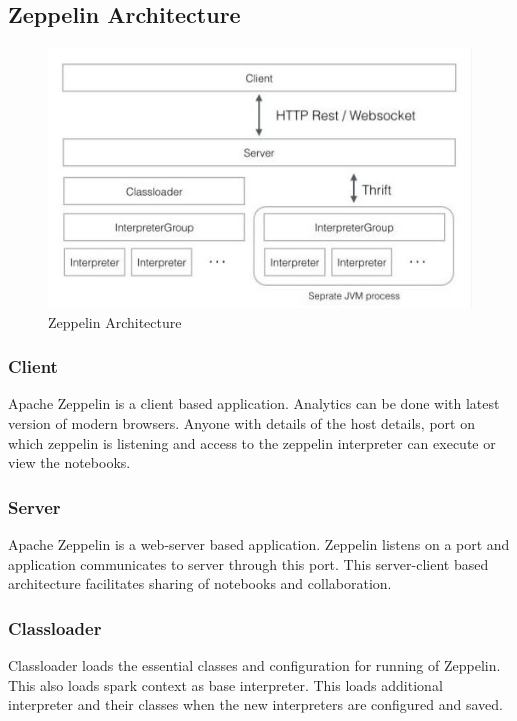 \documentclass[9pt,twocolumn,twoside]{../../styles/osajnl}
\begin{document}
	\subsection{Zeppelin Architecture}
	
	\begin{figure}
		\includegraphics[width=\linewidth]{./images/zeppelin-arch}
		\caption{Zeppelin Architecture}
		\label{fig:Zeppelin Architecture}
	\end{figure}
	
	\subsubsection{Client}
	Apache Zeppelin is a client based application. Analytics can be 
	done with latest version of modern browsers. Anyone with details 
	of the host details, port on which zeppelin is listening and 
	access to the zeppelin interpreter can execute or view the 
	notebooks.
	
	\subsubsection{Server}
	Apache Zeppelin is a web-server based application. Zeppelin 
	listens on a port and application communicates to server through 
	this port. This server-client based architecture facilitates 
	sharing of notebooks and collaboration.  
	
	\subsubsection{Classloader}
	Classloader loads the essential classes and configuration for 
	running of Zeppelin. This also loads spark context as base 
	interpreter. This loads additional interpreter and their classes 
	when the new interpreters are configured and saved.
	
\end{document}
